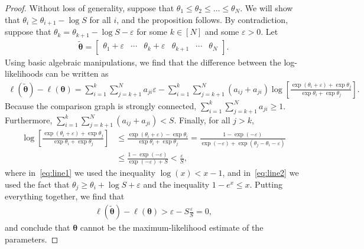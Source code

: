 \documentclass[12pt,a4paper,oneside]{article}
\theoremstyle{plain}
\begin{document}
\begin{proof}
Without loss of generality, suppose that $\theta_1 \le \theta_2 \le \ldots \le \theta_N$.
We will show that $\theta_i \ge \theta_{i+1} - \log S$ for all $i$, and the proposition follows.
By contradiction, suppose that $\theta_k = \theta_{k+1} - \log S - \varepsilon$ for some $k \in [N]$ and some $\varepsilon > 0$.
Let
\begin{align*}
\tilde{\bm{\theta}} =
\begin{bmatrix}
\theta_1 + \varepsilon & \cdots & \theta_k + \varepsilon & \theta_{k+1} & \cdots & \theta_N
\end{bmatrix}.
\end{align*}
Using basic algebraic manipulations, we find that the difference between the log-likelihoods can be written as
\begin{align*}
\ell(\tilde{\bm{\theta}}) - \ell(\bm{\theta}) =
    \sum_{i=1}^k \sum_{j = k+1}^N a_{ji} \varepsilon
  - \sum_{i=1}^k \sum_{j = k+1}^N (a_{ij} + a_{ji})
        \log \left[ \frac{\exp(\theta_i + \varepsilon) + \exp \theta_j}{\exp \theta_i + \exp \theta_j} \right].
\end{align*}
Because the comparison graph is strongly connected, $\sum_{i=1}^k \sum_{j = k+1}^N a_{ji} \ge 1$.
Furthermore, $\sum_{i=1}^k \sum_{j = k+1}^N (a_{ij} + a_{ji}) < S$.
Finally, for all $j > k$,
\begin{align}
\log \left[ \frac{\exp(\theta_i + \varepsilon) + \exp \theta_j}{\exp \theta_i + \exp \theta_j} \right]
    &\le \frac{\exp(\theta_i + \varepsilon) - \exp \theta_i}{\exp \theta_i + \exp \theta_j}
       = \frac{1 - \exp(-\varepsilon)}{\exp(-\varepsilon) + \exp(\theta_j - \theta_i - \varepsilon)} \label{eq:line1}\\
    &\le \frac{1 - \exp(-\varepsilon)}{\exp(-\varepsilon) + S}
       < \frac{\varepsilon}{S}, \label{eq:line2}
\end{align}
where in~\eqref{eq:line1} we used the inequality $\log(x) < x - 1$, and in~\eqref{eq:line2} we used the fact that $\theta_j \ge \theta_i + \log S + \varepsilon$ and the inequality $1 - e^x \le x$.
Putting everything together, we find that
\begin{align*}
\ell(\tilde{\bm{\theta}}) - \ell(\bm{\theta}) > \varepsilon - S \frac{\varepsilon}{S} = 0,
\end{align*}
and conclude that $\bm{\theta}$ cannot be the maximum-likelihood estimate of the parameters.
\end{proof}
\end{document}
